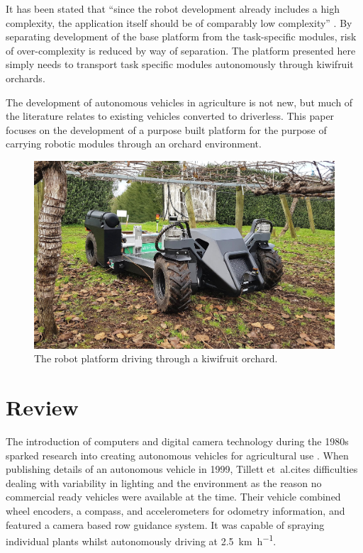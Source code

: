 \documentclass[preprint,authoryear,12pt]{elsarticle}
\begin{document}
    It has been stated that ``since the robot development already includes a high complexity, the application itself should be of comparably low complexity'' \citep{Ruckelshausen2009}.
    By separating development of the base platform from the task-specific modules, risk of over-complexity is reduced by way of separation.
    The platform presented here simply needs to transport task specific modules autonomously through kiwifruit orchards.

    The development of autonomous vehicles in agriculture is not new, but much of the literature relates to existing vehicles converted to driverless.
    This paper focuses on the development of a purpose built platform for the purpose of carrying robotic modules through an orchard environment.

    \begin{figure}[htb]
        \centering
        \includegraphics[width=\linewidth]{imgs/photos/suzy_general.jpg}
        \caption{
            The robot platform driving through a kiwifruit orchard.
        }
        \label{fig:suzy}
    \end{figure}

\section{Review}
\label{sect:review}

    The introduction of computers and digital camera technology during the 1980s sparked research into creating autonomous vehicles for agricultural use \cite{Li2009}.
    When publishing details of an autonomous vehicle in 1999, Tillett et~al.\@ cites difficulties dealing with variability in lighting and the environment as the reason no commercial ready vehicles were available at the time.
    Their vehicle combined wheel encoders, a compass, and accelerometers for odometry information, and featured a camera based row guidance system.
    It was capable of spraying individual plants whilst autonomously driving at \SI{2.5}{\kilo\meter\per\hour}.
    
\end{document}
